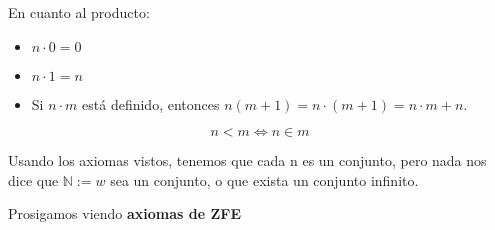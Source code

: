 	\begin{defn}
		En cuanto al producto:
		\begin{itemize}
			\item $n\cdot0 = 0$
			\item $n\cdot1=n$
			\item Si $n\cdot m$ está definido, entonces $n(m+1) = n\cdot (m+1) = n\cdot m + n$.
		\end{itemize}
	\end{defn}
	
	\begin{defn}[Menor]
		$$n<m\iff n\in m$$
	\end{defn}
	
	Usando los axiomas vistos, tenemos que cada n es un conjunto, pero nada nos dice que $\mathbb{N} :=w$ sea un conjunto, o que exista un conjunto infinito.

	Prosigamos viendo \textbf{axiomas de ZFE}
	
